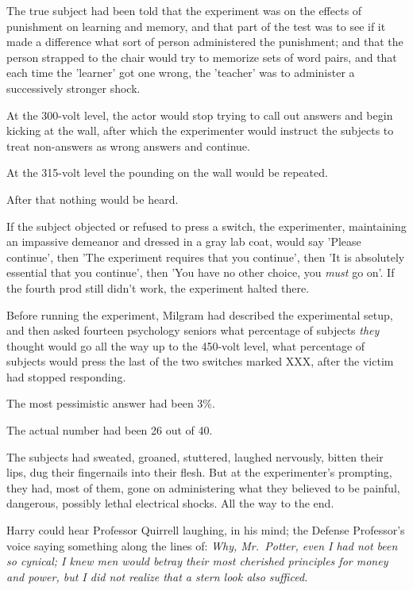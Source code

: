 The true subject had been told that the experiment was on the effects of 
punishment on learning and memory, and that part of the test was to see if it 
made a difference what sort of person administered the punishment; and that the 
person strapped to the chair would try to memorize sets of word pairs, and that 
each time the 'learner' got one wrong, the 'teacher' was to administer a 
successively stronger shock.

At the 300-volt level, the actor would stop trying to call out answers and 
begin kicking at the wall, after which the experimenter would instruct the 
subjects to treat non-answers as wrong answers and continue.

At the 315-volt level the pounding on the wall would be repeated.

After that nothing would be heard.

If the subject objected or refused to press a switch, the experimenter, 
maintaining an impassive demeanor and dressed in a gray lab coat, would say 
'Please continue', then 'The experiment requires that you continue', then 'It 
is absolutely essential that you continue', then 'You have no other choice, you 
\emph{must} go on'. If the fourth prod still didn't work, the experiment halted 
there.

Before running the experiment, Milgram had described the experimental setup, 
and then asked fourteen psychology seniors what percentage of subjects 
\emph{they} thought would go all the way up to the 450-volt level, what 
percentage of subjects would press the last of the two switches marked XXX, 
after the victim had stopped responding.

The most pessimistic answer had been 3\%.

The actual number had been 26 out of 40.

The subjects had sweated, groaned, stuttered, laughed nervously, bitten their 
lips, dug their fingernails into their flesh. But at the experimenter's 
prompting, they had, most of them, gone on administering what they believed to 
be painful, dangerous, possibly lethal electrical shocks. All the way to the 
end.

Harry could hear Professor Quirrell laughing, in his mind; the Defense 
Professor's voice saying something along the lines of: \emph{Why, Mr.~Potter, 
even I had not been so cynical; I knew men would betray their most cherished 
principles for money and power, but I did not realize that a stern look also 
sufficed.}

